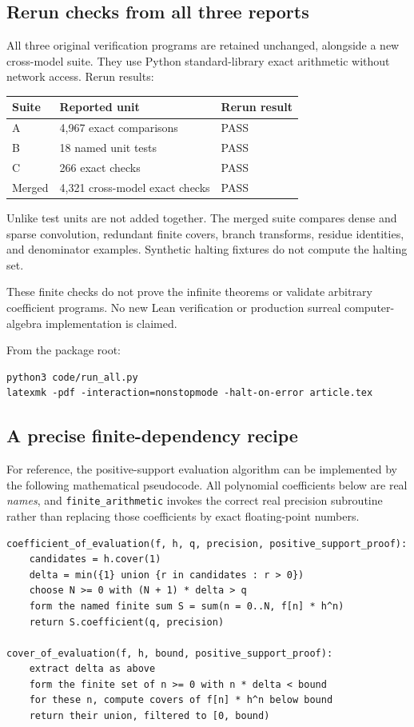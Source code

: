 \documentclass[11pt,letterpaper]{article}
\numberwithin{equation}{section}
\theoremstyle{definition}
\theoremstyle{remark}
\begin{document}
\subsection{Rerun checks from all three reports}
All three original verification programs are retained unchanged, alongside
a new cross-model suite. They use Python standard-library exact arithmetic
without network access. Rerun results:
\begin{center}
\begin{tabular}{@{}lll@{}}
\toprule
Suite & Reported unit & Rerun result\\
\midrule
A & 4,967 exact comparisons & PASS\\
B & 18 named unit tests & PASS\\
C & 266 exact checks & PASS\\
Merged & 4,321 cross-model exact checks & PASS\\
\bottomrule
\end{tabular}
\end{center}
Unlike test units are not added together. The merged suite compares dense
and sparse convolution, redundant finite covers, branch transforms, residue
identities, and denominator examples. Synthetic halting fixtures do not
compute the halting set.

These finite checks do not prove the infinite theorems or validate arbitrary
coefficient programs. No new Lean verification or production surreal
computer-algebra implementation is claimed.

From the package root:
\begin{lstlisting}
python3 code/run_all.py
latexmk -pdf -interaction=nonstopmode -halt-on-error article.tex
\end{lstlisting}

\subsection{A precise finite-dependency recipe}

For reference, the positive-support evaluation algorithm can be implemented
by the following mathematical pseudocode. All polynomial coefficients
below are real \emph{names}, and \texttt{finite\_arithmetic} invokes the
correct real precision subroutine rather than replacing those coefficients
by exact floating-point numbers.
\begin{lstlisting}
coefficient_of_evaluation(f, h, q, precision, positive_support_proof):
    candidates = h.cover(1)
    delta = min({1} union {r in candidates : r > 0})
    choose N >= 0 with (N + 1) * delta > q
    form the named finite sum S = sum(n = 0..N, f[n] * h^n)
    return S.coefficient(q, precision)

cover_of_evaluation(f, h, bound, positive_support_proof):
    extract delta as above
    form the finite set of n >= 0 with n * delta < bound
    for these n, compute covers of f[n] * h^n below bound
    return their union, filtered to [0, bound)
\end{lstlisting}
\end{document}
